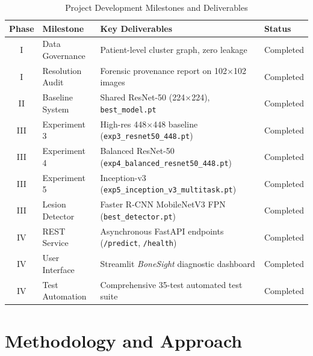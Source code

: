 \documentclass[12pt, a4paper]{report}
\begin{document}
\begin{table}[H]
\centering
\caption{Project Development Milestones and Deliverables}
\label{tab:roadmap}
\begin{tabularx}{\textwidth}{clXl}
\toprule
\textbf{Phase} & \textbf{Milestone} & \textbf{Key Deliverables} & \textbf{Status} \\
\midrule
I & Data Governance & Patient-level cluster graph, zero leakage & Completed \\
I & Resolution Audit & Forensic provenance report on 102$\times$102 images & Completed \\
II & Baseline System & Shared ResNet-50 (224$\times$224), \texttt{best\_model.pt} & Completed \\
III & Experiment 3 & High-res 448$\times$448 baseline (\texttt{exp3\_resnet50\_448.pt}) & Completed \\
III & Experiment 4 & Balanced ResNet-50 (\texttt{exp4\_balanced\_resnet50\_448.pt}) & Completed \\
III & Experiment 5 & Inception-v3 (\texttt{exp5\_inception\_v3\_multitask.pt}) & Completed \\
III & Lesion Detector & Faster R-CNN MobileNetV3 FPN (\texttt{best\_detector.pt}) & Completed \\
IV & REST Service & Asynchronous FastAPI endpoints (\texttt{/predict}, \texttt{/health}) & Completed \\
IV & User Interface & Streamlit \textit{BoneSight} diagnostic dashboard & Completed \\
IV & Test Automation & Comprehensive 35-test automated test suite & Completed \\
\bottomrule
\end{tabularx}
\end{table}

\newpage
\chapter{Methodology and Approach}
\end{document}
